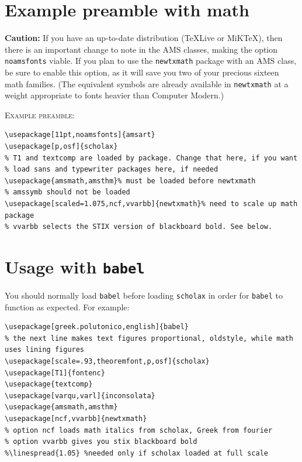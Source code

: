 \documentclass[11pt]{article}
\theoremstyle{oldplain}
\theoremstyle{plain}
\begin{document}
\section*{Example preamble with math} 
\textbf{Caution:} If you have an up-to-date distribution (TeXLive or MiKTeX), then there is an important change to note in the AMS classes, making the option {\tt noamsfonts} viable. If you plan to use the {\tt newtxmath} package with an AMS class, be sure to enable this option, as it will save you two of your precious sixteen math families. (The equivalent symbols are already available in {\tt newtxmath} at a weight appropriate to fonts heavier than Computer Modern.)

\textsc{Example preamble:}
\begin{verbatim}
\usepackage[11pt,noamsfonts]{amsart}
\usepackage[p,osf]{scholax} 
% T1 and textcomp are loaded by package. Change that here, if you want
% load sans and typewriter packages here, if needed
\usepackage{amsmath,amsthm}% must be loaded before newtxmath
% amssymb should not be loaded
\usepackage[scaled=1.075,ncf,vvarbb]{newtxmath}% need to scale up math package
% vvarbb selects the STIX version of blackboard bold. See below.
\end{verbatim}

\section*{Usage with {\tt babel}}
You should normally load {\tt babel} before loading {\tt scholax} in order for {\tt babel} to function as expected.   For example:
\begin{verbatim}
\usepackage[greek.polutonico,english]{babel}
% the next line makes text figures proportional, oldstyle, while math uses lining figures
\usepackage[scale=.93,theoremfont,p,osf]{scholax}
\usepackage[T1]{fontenc}
\usepackage{textcomp}
\usepackage[varqu,varl]{inconsolata}
\usepackage{amsmath,amsthm}
\usepackage[ncf,vvarbb]{newtxmath} 
% option ncf loads math italics from scholax, Greek from fourier 
% option vvarbb gives you stix blackboard bold
%\linespread{1.05} %needed only if scholax loaded at full scale
\end{verbatim}
\end{document}
